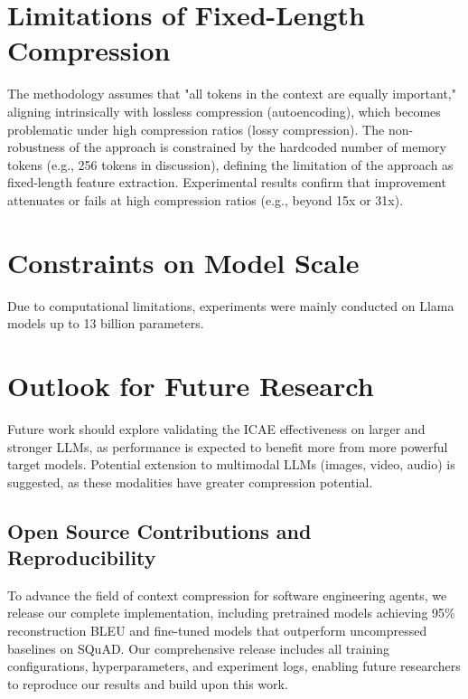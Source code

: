 \section{Limitations of Fixed-Length Compression}

The methodology assumes that "all tokens in the context are equally important," aligning intrinsically with lossless compression (autoencoding), which becomes problematic under high compression ratios (lossy compression).
The non-robustness of the approach is constrained by the hardcoded number of memory tokens (e.g., 256 tokens in discussion), defining the limitation of the approach as fixed-length feature extraction.
Experimental results confirm that improvement attenuates or fails at high compression ratios (e.g., beyond 15x or 31x).


\section{Constraints on Model Scale}

Due to computational limitations, experiments were mainly conducted on Llama models up to 13 billion parameters.


\section{Outlook for Future Research}

Future work should explore validating the ICAE \cite{ge_-context_2024} effectiveness on larger and stronger LLMs, as performance is expected to benefit more from more powerful target models.
Potential extension to multimodal LLMs (images, video, audio) is suggested, as these modalities have greater compression potential.

\subsection{Open Source Contributions and Reproducibility}

To advance the field of context compression for software engineering agents, we release our complete implementation, including pretrained models achieving 95\% reconstruction BLEU and fine-tuned models that outperform uncompressed baselines on SQuAD. Our comprehensive release includes all training configurations, hyperparameters, and experiment logs, enabling future researchers to reproduce our results and build upon this work.

